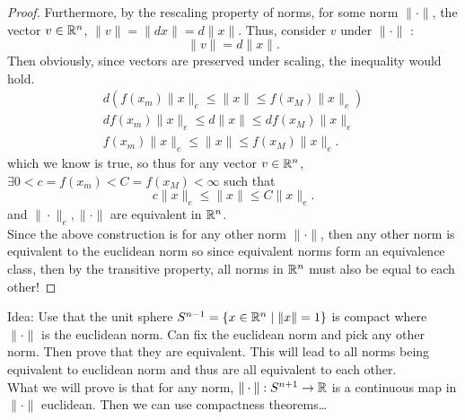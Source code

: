 \documentclass[a4paper]{article}
\begin{document}
\begin{enumerate}
\begin{proof}
Furthermore, by the rescaling property of norms, for some norm $\|\cdot \|$, the vector $v \in \mathbb{R}^{n}$, $\|v\| =  \|d x\| = d  \|x\|$. Thus, consider $v$ under  $\| \cdot \|$ :
\[
  \|v\| = d \|x\| 
.\] 
Then obviously, since vectors are preserved under scaling, the inequality would hold.
\begin{align*}
 d( f(x_m) \|x \|_{e} \leq \|x\| \leq f(x_M) \|x\|_{e} )\\
 d f(x_m) \|x \|_{e} \leq d \|x\| \leq d f(x_M) \|x\|_{e} \\
f(x_m) \|x \|_{e} \leq \|x\| \leq f(x_M) \|x\|_{e} 
.\end{align*}
which we know is true, so thus for any vector $v \in \mathbb{R}^{n}$, $\exists 0 < c=f(x_m) < C=f(x_M) < \infty$ such that 
\[
c \|x \|_{e} \leq \|x\| \leq C \|x\|_{e} 
.\] 
and $\| \cdot \|_{e}, \| \cdot \|$ are equivalent in $\mathbb{R}^{n}$. \\

Since the above construction is for any other norm $\|\cdot \|$, then any other norm is equivalent to the euclidean norm so since equivalent norms form an equivalence class, then by the transitive property, all norms in $\mathbb{R}^{n}$ must also be equal to each other!
      \end{proof}
  \end{enumerate}

  \begin{note}
           Idea: Use that the unit sphere $S^{n-1} = \{x \in \mathbb{R}^{n} \mid \|x\| =1\}$ is compact where $\|\cdot\|$ is the euclidean norm. Can fix the euclidean norm and pick any other norm. Then prove that they are equivalent. This will lead to all norms being equivalent to euclidean norm and thus are all equivalent to each other. \\

       What we will prove is that for any norm, $\|\cdot\|: S^{n+1} \to \mathbb{R}$ is a continuous map in $\|\cdot\|$ euclidean. Then we can use compactness theorems\ldots \\


  \end{note}
\end{document}
